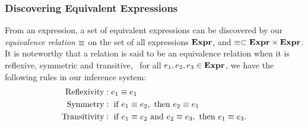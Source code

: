 \subsubsection{Discovering Equivalent Expressions}

From an expression, a set of equivalent expressions can be discovered by our
\emph{equivalence relation} $\equiv$ on the set of all expressions $\mathbf{Expr}$,
and $\equiv \subset \mathbf{Expr}\times\mathbf{Expr}$.  It is noteworthy that a relation
is said to be an equivalence relation when it is reflexive, symmetric and
transitive, \ie~for all $e_1, e_2, e_3 \in \mathbf{Expr}$, we have the following
rules in our inference system:
\begin{equation}
    \begin{aligned}
        \text{Reflexivity}
            &: e_1 \equiv e_1 \\
        \text{Symmetry}
            &: \text{~if~} e_1 \equiv e_2,
            \text{~then~} e_2 \equiv e_1 \\
        \text{Transitivity}
            &: \text{~if~} e_1 \equiv e_2 \text{~and~} e_2 \equiv e_3,
            \text{~then~} e_1 \equiv e_3.
    \end{aligned}
\end{equation}

